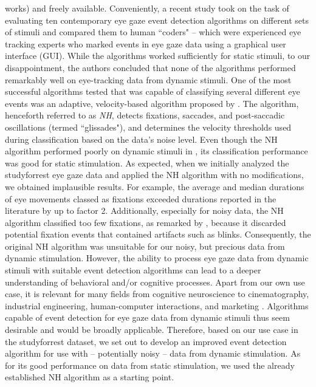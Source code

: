 works) and freely available. Conveniently, a recent study \citep{Andersson2017} took on the task of evaluating
ten contemporary eye gaze event detection algorithms on  different sets of stimuli and compared them to human
``coders" -- which were experienced eye tracking experts who marked events in eye gaze data using a graphical
user interface (GUI). While the algorithms worked sufficiently for static stimuli, to our disappointment, the
authors concluded that none of the algorithms performed remarkably well on eye-tracking data from dynamic stimuli.
One of the most successful algorithms tested that was capable of classifying several different eye
events was an adaptive, velocity-based algorithm proposed by \citet{Nystrom2010AnData}.
The algorithm, henceforth referred to as \textit{NH}, detects fixations, saccades, and post-saccadic
oscillations (termed ``glissades"), and determines the velocity thresholds used during classification based on the
data's noise level. Even though the NH algorithm performed poorly on dynamic stimuli in \citet{Andersson2017}, its
classification performance was good for static stimulation. As expected, when we initially analyzed the
studyforrest eye gaze data and applied the NH algorithm with no modifications, we obtained implausible results.
For example, the average and median durations of eye movements  classed as fixations exceeded durations  reported in
the literature \citep{holmqvist2011eye,dorr2010variability} by up to factor 2. Additionally, especially for noisy
data, the NH algorithm classified too few fixations, as remarked by \citet{Friedman2018}, because it discarded
potential fixation events that contained artifacts such as blinks. Consequently, the original NH algorithm was
unsuitable for our noisy, but precious data from dynamic stimulation.
However, the ability to process eye gaze data from dynamic stimuli with suitable event detection algorithms can
lead to a deeper understanding of behavioral and/or cognitive processes. Apart from our own use case, it is
relevant for many fields from  cognitive neuroscience to cinematography, industrial engineering, human-computer
interactions, and marketing \citep{Duchowski2002}. Algorithms capable of event detection for eye gaze data
from dynamic stimuli thus seem desirable and would be broadly applicable. Therefore, based on our use case in the
studyforrest dataset, we set out to develop an improved event detection algorithm for use with -- potentially noisy
-- data from dynamic stimulation. As for its good performance on data from static stimulation, we used the already
established NH algorithm as a starting point. \\
